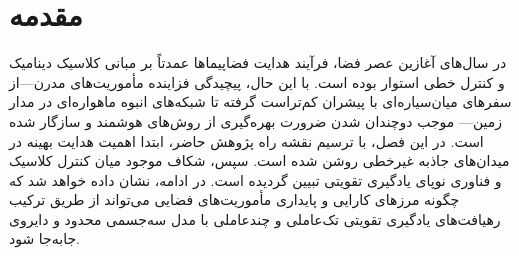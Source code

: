 \chapter{مقدمه}
\noindent 
در سال‌های آغازین عصر فضا، فرآیند هدایت فضاپیماها عمدتاً بر مبانی کلاسیک دینامیک و کنترل خطی استوار بوده است. با این حال، پیچیدگی فزاینده مأموریت‌های مدرن—از سفرهای میان‌سیاره‌ای با پیشران کم‌تراست گرفته تا شبکه‌های انبوه ماهواره‌ای در مدار زمین— موجب دوچندان شدن ضرورت بهره‌گیری از روش‌های هوشمند و سازگار شده است.
در این فصل، با ترسیم نقشه راه پژوهش حاضر، ابتدا اهمیت هدایت بهینه در میدان‌های جاذبه غیرخطی روشن شده است. سپس، شکاف موجود میان کنترل کلاسیک و فناوری نوپای یادگیری تقویتی تبیین گردیده است. در ادامه، نشان داده خواهد شد که چگونه مرزهای کارایی و پایداری مأموریت‌های فضایی می‌تواند از طریق ترکیب رهیافت‌های یادگیری تقویتی تک‌عاملی و چندعاملی با مدل سه‌جسمی محدود و دایروی جابه‌جا شود.










